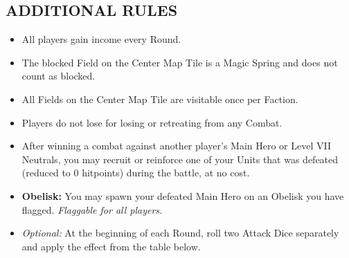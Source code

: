\begin{multicols*}{2}
\subsection*{\MakeUppercase{Additional Rules}}
\begin{itemize}
  \item All players gain income every Round.
  \item The blocked Field on the Center Map Tile is a Magic Spring and does not count as blocked.
  \item All Fields on the Center Map Tile are visitable once per Faction.
  \item Players do not lose  for losing or retreating from any Combat.
  \item After winning a combat against another player’s Main Hero or Level VII Neutrals, you may recruit or reinforce one of your Units that was defeated (reduced to 0 hitpoints) during the battle, at no cost.
  \item \textbf{Obelisk:} You may spawn your defeated Main Hero on an Obelisk you have flagged. \textit{Flaggable for all players.}
  \item \textit{Optional:} At the beginning of each Round, roll two Attack Dice separately and apply the effect from the table below.
\end{itemize}

\vspace*{\fill}
\end{multicols*}
